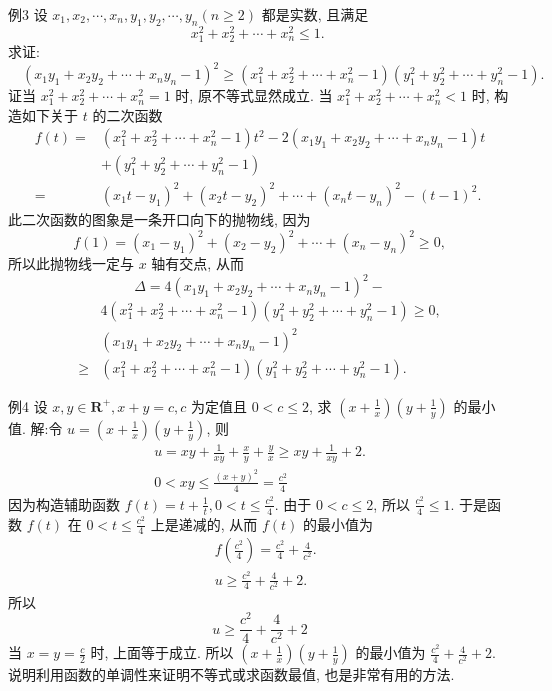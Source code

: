 例3 设 $x_1, x_2, \cdots, x_n, y_1, y_2, \cdots, y_n(n \geqslant 2)$ 都是实数, 且满足
$$
x_1^2+x_2^2+\cdots+x_n^2 \leqslant 1 \text {. }
$$
求证: $\quad\left(x_1 y_1+x_2 y_2+\cdots+x_n y_n-1\right)^2 \geqslant\left(x_1^2+x_2^2+\cdots+x_n^2-1\right)\left(y_1^2+y_2^2+\cdots+y_n^2-1\right) .$
证当 $x_1^2+x_2^2+\cdots+x_n^2=1$ 时, 原不等式显然成立.
当 $x_1^2+x_2^2+\cdots+x_n^2<1$ 时, 构造如下关于 $t$ 的二次函数
$$
\begin{aligned}
f(t)= & \left(x_1^2+x_2^2+\cdots+x_n^2-1\right) t^2-2\left(x_1 y_1+x_2 y_2+\cdots+x_n y_n-1\right) t \\
& +\left(y_1^2+y_2^2+\cdots+y_n^2-1\right) \\
= & \left(x_1 t-y_1\right)^2+\left(x_2 t-y_2\right)^2+\cdots+\left(x_n t-y_n\right)^2-(t-1)^2 .
\end{aligned}
$$
此二次函数的图象是一条开口向下的抛物线, 因为
$$
f(1)=\left(x_1-y_1\right)^2+\left(x_2-y_2\right)^2+\cdots+\left(x_n-y_n\right)^2 \geqslant 0,
$$
所以此抛物线一定与 $x$ 轴有交点, 从而
$$
\Delta=4\left(x_1 y_1+x_2 y_2+\cdots+x_n y_n-1\right)^2-
$$
$$
\begin{aligned}
& 4\left(x_1^2+x_2^2+\cdots+x_n^2-1\right)\left(y_1^2+y_2^2+\cdots+y_n^2-1\right) \geqslant 0, \\
& \left(x_1 y_1+x_2 y_2+\cdots+x_n y_n-1\right)^2 \\
\geqslant & \left(x_1^2+x_2^2+\cdots+x_n^2-1\right)\left(y_1^2+y_2^2+\cdots+y_n^2-1\right) .
\end{aligned}
$$



例4 设 $x, y \in \mathbf{R}^{+}, x+y=c, c$ 为定值且 $0<c \leqslant 2$, 求 $\left(x+\frac{1}{x}\right)\left(y+\frac{1}{y}\right)$ 的最小值.
解:令 $u=\left(x+\frac{1}{x}\right)\left(y+\frac{1}{y}\right)$, 则
$$
\begin{gathered}
u=x y+\frac{1}{x y}+\frac{x}{y}+\frac{y}{x} \geqslant x y+\frac{1}{x y}+2 . \\
0<x y \leqslant \frac{(x+y)^2}{4}=\frac{c^2}{4}
\end{gathered}
$$
因为构造辅助函数 $f(t)=t+\frac{1}{t}, 0<t \leqslant \frac{c^2}{4}$.
由于 $0<c \leqslant 2$, 所以 $\frac{c^2}{4} \leqslant 1$. 于是函数 $f(t)$ 在 $0<t \leqslant \frac{c^2}{4}$ 上是递减的, 从而 $f(t)$ 的最小值为
$$
\begin{aligned}
& f\left(\frac{c^2}{4}\right)=\frac{c^2}{4}+\frac{4}{c^2} . \\
& u \geqslant \frac{c^2}{4}+\frac{4}{c^2}+2 .
\end{aligned}
$$
所以
$$
u \geqslant \frac{c^2}{4}+\frac{4}{c^2}+2
$$
当 $x=y=\frac{c}{2}$ 时, 上面等于成立.
所以 $\left(x+\frac{1}{x}\right)\left(y+\frac{1}{y}\right)$ 的最小值为 $\frac{c^2}{4}+\frac{4}{c^2}+2$.
说明利用函数的单调性来证明不等式或求函数最值, 也是非常有用的方法.



